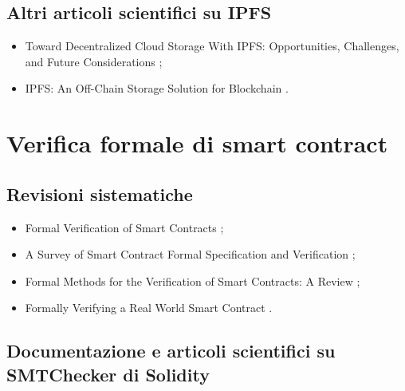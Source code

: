\subsection*{Altri articoli scientifici su IPFS}
\begin{itemize}

\item Toward Decentralized Cloud Storage With IPFS: Opportunities, Challenges, and Future Considerations \cite{doan2022ipfs};

\item IPFS: An Off-Chain Storage Solution for Blockchain \cite{kaur2023ipfs}.

\end{itemize}

\section*{Verifica formale di smart contract}

\subsection*{Revisioni sistematiche}

\begin{itemize}

\item Formal Verification of Smart Contracts \cite{ethereum2024scfvreview};

\item A Survey of Smart Contract Formal Specification and Verification \cite{tolmach2021scfvreview};

\item Formal Methods for the Verification of Smart Contracts: A Review \cite{krichen2022scfvreview};

\item Formally Verifying a Real World Smart Contract \cite{mota2023scfvreview}.

\end{itemize}

\subsection*{Documentazione e articoli scientifici su SMTChecker di Solidity}

